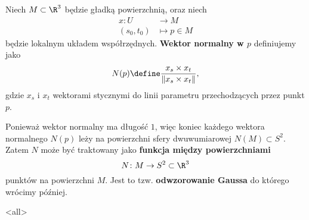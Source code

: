 \begin{frame}[<+->]

\begin{definicja}\label{def:normal-vector}
 Niech $M\subset \R^3$ będzie gładką powierzchnią, oraz niech 
\begin{align*}
x\colon U&\longrightarrow M \\
(s_0,t_0)&\longmapsto p\in M
\end{align*}
będzie lokalnym układem współrzędnych. \textbf{Wektor normalny w $p$} definiujemy jako
\[N(p)\define\frac{x_s\times x_t}{\|x_s\times x_t\|},\]
gdzie $x_s$ i $x_t$ wektorami stycznymi do linii parametru przechodzących przez punkt $p$.
\end{definicja}

\end{frame}
\begin{frame}[<+->]

\begin{uwaga}
Ponieważ wektor normalny ma długość $1$, więc koniec każdego wektora normalnego $N(p)$ leży na powierzchni sfery dwuwumiarowej $N(M)\subset S^2$. Zatem $N$ może być traktowany jako \textbf{funkcja między powierzchniami}\[N\colon M\to S^2\subset\R^3\] punktów na powierzchni $M$. Jest to tzw. \textbf{odwzorowanie Gaussa} do którego wrócimy później.
\end{uwaga}

\end{frame}
\mode<all>{}

